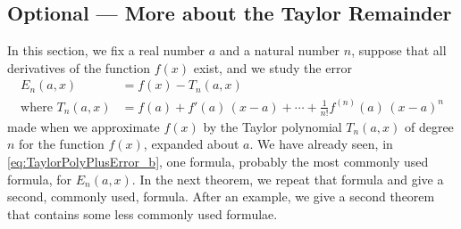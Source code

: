 \subsection*{Optional --- More about the Taylor Remainder}
In this section, we fix a real number $a$ and a natural number $n$,
suppose that all derivatives of the function $f(x)$ exist, and we study the
error
\begin{align*}
E_n(a,x) &= f(x) - T_n(a,x) \\
\text{where } 
T_n(a,x)  &=f(a)+f'(a)\,(x-a)+\cdots+\tfrac{1}{n!}f^{(n)}(a)\, (x-a)^n
\end{align*}
made when we approximate $f(x)$ by the Taylor polynomial $T_n(a,x)$ of degree $n$ for the function $f(x)$, expanded about $a$. We have already seen,
in \eqref{eq:TaylorPolyPlusError_b}, one formula, probably the most commonly used formula, for $E_n(a,x)$. In the next theorem, we repeat that formula
and give a second, commonly used, formula. After an example, we give a second theorem
that contains some less commonly used formulae.

